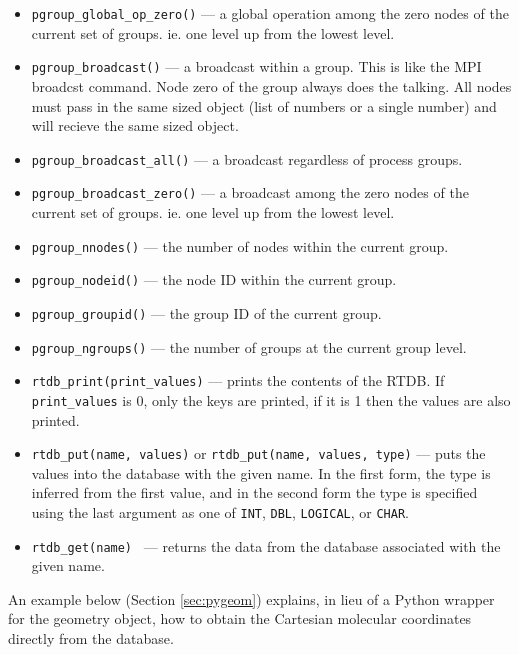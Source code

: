 \begin{itemize}
\item \verb+pgroup_global_op_zero()+ --- a global operation among the zero nodes of the current set of groups.  ie. one level up from the lowest level.


\item \verb+pgroup_broadcast()+ --- a broadcast within a group.  This is like the MPI broadcst command.
  Node zero of the group always does the talking.
  All nodes must pass in the same sized object (list of numbers or a single number)
  and will recieve the same sized object.

\item \verb+pgroup_broadcast_all()+ ---  a broadcast regardless of process groups.

\item \verb+pgroup_broadcast_zero()+ ---  a broadcast among the zero nodes of the current set of groups.  ie. one level up from the lowest level.


\item \verb+pgroup_nnodes()+ --- the number of nodes within the current group.

\item \verb+pgroup_nodeid()+ --- the node ID within the current group.

\item \verb+pgroup_groupid()+ --- the group ID of the current group.

\item \verb+pgroup_ngroups()+ --- the number of groups at the current group level.


\item \verb+rtdb_print(print_values)+ --- prints the contents of the
RTDB.  If \verb+print_values+ is 0, only the keys are printed, if it
is 1 then the values are also printed.

\item \verb+rtdb_put(name, values)+ or
\verb+rtdb_put(name, values, type)+ --- puts the values into the
database with the given name.  In the first form, the type is inferred
from the first value, and in the second form the type is specified
using the last argument as one of \verb+INT+, \verb+DBL+,
\verb+LOGICAL+, or \verb+CHAR+.

\item \verb+rtdb_get(name) + --- returns the data from the database
associated with the given name.
\end{itemize}

An example below (Section \ref{sec:pygeom}) explains, in lieu of a
Python wrapper for the geometry object, how to obtain the Cartesian
molecular coordinates directly from the database.

